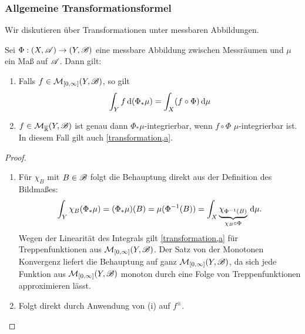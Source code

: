 \subsubsection{Allgemeine Transformationsformel}
Wir diskutieren über Transformationen unter messbaren Abbildungen.
\begin{satz}
\begin{mdframed}
Sei $\Phi:(X,\AA)\to (Y,\BB)$ eine messbare Abbildung zwischen Messräumen und $\mu$ ein Maß auf $\AA$. 
Dann gilt:
\begin{enumerate}
	\item Falls $f \in \MM_{[0,\infty]}(Y,\BB)$, so gilt
	\begin{equation} \label{transformation,a}
		\int_Yf\D (\Phi_*\mu) =\int_X (f\circ \Phi)\D\mu
	\end{equation}
	\item $f\in \MM_{\ol\R}(Y,\BB)$ ist genau dann $\Phi_*\mu$-integrierbar, wenn $f\circ \Phi$ $\mu$-integrierbar ist. In diesem Fall gilt auch \eqref{transformation,a}.
\end{enumerate}
\end{mdframed}
\begin{proof}
\begin{enumerate}
\item Für $\chi_B$ mit $B\in\BB$ folgt die Behauptung direkt aus der Definition des Bildmaßes:
$$
\int_Y \chi_B(\Phi_*\mu)=(\Phi_*\mu)(B)=\mu(\Phi^{-1}(B))=\int_X \underbrace{\chi_{\Phi^{-1}(B)}}_{ \chi_B\circ\Phi}\D\mu.
$$
Wegen der Linearität des Integrals gilt \eqref{transformation,a} für Treppenfunktionen aus $\MM_{[0,\infty]}(Y,\BB)$. Der Satz von der Monotonen Konvergenz liefert die Behauptung auf ganz $\MM_{[0,\infty]}(Y,\BB)$, da sich jede Funktion aus $\MM_{[0,\infty]}(Y,\BB)$ monoton durch eine Folge von Treppenfunktionen approximieren lässt.
\item Folgt direkt durch Anwendung von (i) auf $f^\pm$.
\end{enumerate}
\end{proof}
\end{satz}

